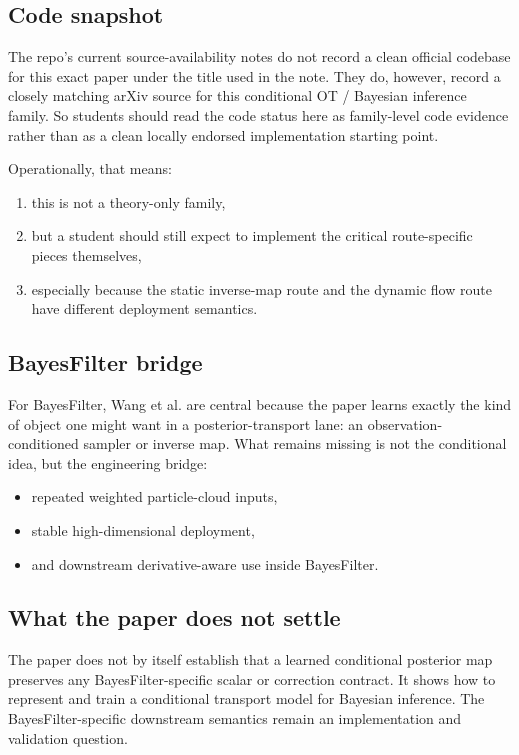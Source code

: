 \documentclass[11pt]{report}
\begin{document}
\subsection*{Code snapshot}

The repo's current source-availability notes do not record a clean official codebase
for this exact paper under the title used in the note.  They do, however, record a
closely matching arXiv source for this conditional OT / Bayesian inference family.
So students should read the code status here as family-level code evidence rather
than as a clean locally endorsed implementation starting point.

Operationally, that means:
\begin{enumerate}[label=(\roman*)]
  \item this is not a theory-only family,
  \item but a student should still expect to implement the critical route-specific pieces themselves,
  \item especially because the static inverse-map route and the dynamic flow route have different deployment semantics.
\end{enumerate}

\subsection*{BayesFilter bridge}

For BayesFilter, Wang et al. are central because the paper learns exactly the kind
of object one might want in a posterior-transport lane: an
observation-conditioned sampler or inverse map.  What remains missing is not the
conditional idea, but the engineering bridge:
\begin{itemize}
  \item repeated weighted particle-cloud inputs,
  \item stable high-dimensional deployment,
  \item and downstream derivative-aware use inside BayesFilter.
\end{itemize}

\subsection*{What the paper does not settle}

The paper does not by itself establish that a learned conditional posterior map
preserves any BayesFilter-specific scalar or correction contract.  It shows how to
represent and train a conditional transport model for Bayesian inference.  The
BayesFilter-specific downstream semantics remain an implementation and validation
question.
\end{document}
